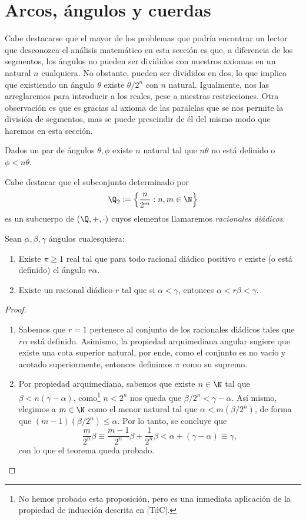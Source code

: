 \documentclass[11pt,a4paper]{book}
\begin{document}
\section{Arcos, ángulos y cuerdas}
Cabe destacarse que el mayor de los problemas que podría encontrar un lector que desconozca el análisis matemático en esta sección es que, a diferencia de los segmentos, los ángulos no pueden ser divididos con nuestros axiomas en un natural $n$ cualquiera. No obstante, pueden ser divididos en dos, lo que implica que existiendo un ángulo $\theta$ existe $\theta/2^n$ con $n$ natural. Igualmente, nos las arreglaremos para introducir a los reales, pese a nuestras restricciones. Otra observación es que es gracias al axioma de las paralelas que se nos permite la división de segmentos, mas se puede prescindir de él del mismo modo que haremos en esta sección.
\begin{thm}
Dados un par de ángulos $\theta,\phi$ existe $n$ natural tal que $n\theta$ no está definido o $\phi<n\theta$.
\end{thm}
Cabe destacar que el subconjunto determinado por
$$\Q_2:=\left\{\frac{n}{2^m}:n,m\in\N\right\}$$
es un subcuerpo de $(\Q,+,\cdot)$ cuyos elementos llamaremos \textit{racionales diádicos}.
\begin{thm}
Sean $\alpha,\beta,\gamma$ ángulos cualesquiera:
\begin{enumerate}
	\item Existe $\pi\geq 1$ real tal que para todo racional diádico positivo $r$ existe (o está definido) el ángulo $r\alpha$.
	\item Existe un racional diádico $r$ tal que si $\alpha<\gamma$, entonces $\alpha<r\beta<\gamma$.
\end{enumerate}
\end{thm}
\begin{proof}
\begin{enumerate}
	\item Sabemos que $r=1$ pertenece al conjunto de los racionales diádicos tales que $r\alpha$ está definido. Asimismo, la propiedad arquimediana angular sugiere que existe una cota superior natural, por ende, como el conjunto es no vacío y acotado superiormente, entonces definimos $\pi$ como su supremo.
	\item Por propiedad arquimediana, sabemos que existe $n\in\N$ tal que $\beta<n(\gamma-\alpha)$, como\footnote{No hemos probado esta proposición, pero es una inmediata aplicación de la propiedad de inducción descrita en [TdC].} $n<2^n$ nos queda que $\beta/2^n<\gamma-\alpha$. Así mismo, elegimos a $m\in\N$ como el menor natural tal que $\alpha<m(\beta/2^n)$, de forma que $(m-1)(\beta/2^n)\leq\alpha$. Por lo tanto, se concluye que
		$$\frac{m}{2^n}\beta\equiv\frac{m-1}{2^n}\beta+\frac{1}{2^n}\beta<\alpha+(\gamma-\alpha)\equiv\gamma,$$
	con lo que el teorema queda probado.
\end{enumerate}
\end{proof}
\end{document}
